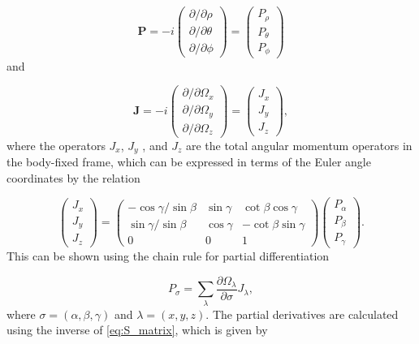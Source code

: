 \begin{equation}
\mathbf{P} = 
-i
\begin{pmatrix}
\partial/\partial\rho\\
\partial/\partial\theta\\
\partial/\partial\phi
\end{pmatrix}
=
\begin{pmatrix}
P_{\rho}\\
P_{\theta}\\
P_{\phi}
\end{pmatrix}
\end{equation}
and

\begin{equation}\label{eq:J_vector}
\mathbf{J} = 
-i
\begin{pmatrix}
\partial/\partial\Omega_x\\
\partial/\partial\Omega_y\\
\partial/\partial\Omega_z
\end{pmatrix}
=
\begin{pmatrix}
J_x\\
J_y\\
J_z
\end{pmatrix},
\end{equation}
where the operators $J_x$, $J_y$ , and $J_z$ are the total angular momentum operators in the body-fixed frame, which can be expressed in terms of the Euler angle coordinates by the relation

\begin{equation}
\begin{pmatrix}
J_x\\
J_y\\
J_z
\end{pmatrix} =
\begin{pmatrix}
-\cos\gamma/\sin\beta & \sin\gamma & \cot\beta \cos\gamma\\
\sin\gamma/\sin\beta & \cos\gamma & -\cot\beta \sin\gamma\\
0 & 0 & 1
\end{pmatrix}
\begin{pmatrix}
P_{\alpha}\\
P_{\beta}\\
P_{\gamma}
\end{pmatrix}.
\end{equation} 
This can be shown using the chain rule for partial differentiation

\begin{equation}
P_{\sigma} = \sum_{\lambda} \frac{\partial \Omega_{\lambda}}{\partial \sigma} J_{\lambda},
\end{equation}
where $\sigma = (\alpha,\beta,\gamma)$ and $\lambda = (x,y,z)$. The partial derivatives are calculated using the inverse of \eqref{eq:S_matrix}, which is given by

